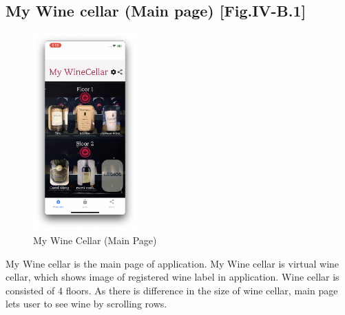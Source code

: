 \documentclass[conference]{IEEEtran}
\numberwithin{figure}{subsection}
\begin{document}
\subsection{My Wine cellar (Main page) [Fig.IV-B.1]}
\begin{figure}[htb!]
    \centerline{\includegraphics[width=4cm]{mywinece.png}}
    \caption{My Wine Cellar (Main Page)}
\end{figure}
My Wine cellar is the main page of application. My Wine cellar is virtual wine cellar, which shows image of registered wine label in application. Wine cellar is consisted of 4 floors. As there is difference in the size of wine cellar, main page lets user to see wine by scrolling rows.
\end{document}
